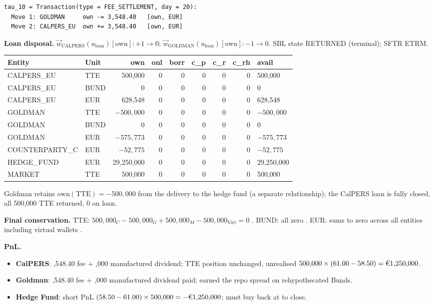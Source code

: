 \documentclass[11pt,a4paper]{article}
\newcommand{\EUR}[1]{\mbox{\texteuro#1}}
\begin{document}
\begin{lstlisting}
tau_10 = Transaction(type = FEE_SETTLEMENT, day = 20):
  Move 1: GOLDMAN     own -= 3,548.40   [own, EUR]
  Move 2: CALPERS_EU  own += 3,548.40   [own, EUR]
\end{lstlisting}

\noindent\textbf{Loan disposal.} $\vec{w}_{\text{CALPERS}}(u_{\mathrm{loan}})[\mathrm{own}]\!: +1 \to 0$; $\vec{w}_{\text{GOLDMAN}}(u_{\mathrm{loan}})[\mathrm{own}]\!: -1 \to 0$. SBL state RETURNED (terminal); SFTR ETRM.

\begin{center}\small
\begin{tabular}{l l r r r r r r l}
\toprule
\textbf{Entity} & \textbf{Unit} & own & onl & borr & c\_p & c\_r & c\_rh & avail \\
\midrule
CALPERS\_EU & TTE & 500{,}000 & 0 & 0 & 0 & 0 & 0 & 500{,}000 \\
CALPERS\_EU & BUND & 0 & 0 & 0 & 0 & 0 & 0 & 0 \\
CALPERS\_EU & EUR & 628{,}548 & 0 & 0 & 0 & 0 & 0 & 628{,}548 \\
GOLDMAN & TTE & $-500{,}000$ & 0 & 0 & 0 & 0 & 0 & $-500{,}000$ \\
GOLDMAN & BUND & 0 & 0 & 0 & 0 & 0 & 0 & 0 \\
GOLDMAN & EUR & $-575{,}773$ & 0 & 0 & 0 & 0 & 0 & $-575{,}773$ \\
COUNTERPARTY\_C & EUR & $-52{,}775$ & 0 & 0 & 0 & 0 & 0 & $-52{,}775$ \\
HEDGE\_FUND & EUR & 29{,}250{,}000 & 0 & 0 & 0 & 0 & 0 & 29{,}250{,}000 \\
MARKET & TTE & 500{,}000 & 0 & 0 & 0 & 0 & 0 & 500{,}000 \\
\bottomrule
\end{tabular}
\end{center}

\noindent Goldman retains $\mathrm{own}(\text{TTE}) = -500{,}000$ from the delivery to the hedge fund (a separate relationship); the CalPERS loan is fully closed, all 500{,}000 TTE returned, 0 on loan.

\noindent\textbf{Final conservation.} TTE: $500{,}000_C - 500{,}000_G + 500{,}000_M - 500{,}000_{\mathrm{Virt}} = 0$ \checkmark. BUND: all zero \checkmark. EUR: sums to zero across all entities including virtual wallets \checkmark.

\noindent\textbf{PnL.}
\begin{itemize}[nosep]
\item \textbf{CalPERS}: \EUR{3,548.40} fee $+$ \EUR{625,000} manufactured dividend; TTE position unchanged, unrealised $500{,}000 \times (61.00 - 58.50) = \text{\EUR{1,250,000}}$.
\item \textbf{Goldman}: \EUR{3,548.40} fee $+$ \EUR{625,000} manufactured dividend paid; earned the repo spread on rehypothecated Bunds.
\item \textbf{Hedge Fund}: short PnL $(58.50 - 61.00) \times 500{,}000 = -\text{\EUR{1,250,000}}$; must buy back at \EUR{61.00} to close.
\end{itemize}
\end{document}
